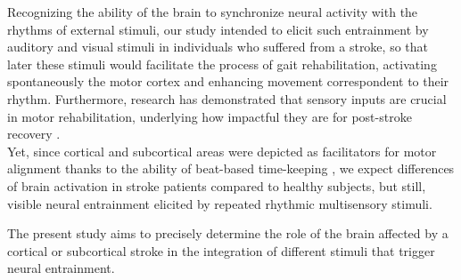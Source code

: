 Recognizing the ability of the brain to synchronize neural activity with the rhythms of external stimuli, our study intended to elicit such entrainment by auditory and visual stimuli in individuals who suffered from a stroke, so that later these stimuli would facilitate the process of gait rehabilitation, activating spontaneously the motor cortex and enhancing movement correspondent to their rhythm. Furthermore, research has demonstrated that sensory inputs are crucial in motor rehabilitation, underlying how impactful they are for post-stroke recovery \parencite{Chen_2018}.\\
Yet, since cortical and subcortical areas were depicted as facilitators for motor alignment thanks to the ability of beat-based time-keeping \parencite{Cannon_2021}, we expect differences of brain activation in stroke patients compared to healthy subjects, but still, visible neural entrainment elicited by repeated rhythmic multisensory stimuli. 


The present study aims to precisely determine the role of the brain affected by a cortical or subcortical stroke in the integration of different stimuli that trigger neural entrainment. 


